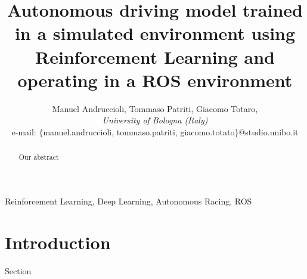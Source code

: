 \documentclass[conference]{IEEEtran}
\begin{document}
\title{
    Autonomous driving model trained in a simulated environment using Reinforcement Learning and operating in a ROS environment
}

\author{Manuel Andruccioli,
Tommaso Patriti,
Giacomo Totaro,\\ 
\textit{University of Bologna (Italy)} \\
e-mail: $\{$manuel.andruccioli, tommaso.patriti, giacomo.totato$\}$@studio.unibo.it }

\maketitle

\begin{abstract}
Our abstract
\end{abstract}

\begin{IEEEkeywords}
    Reinforcement Learning, Deep Learning, Autonomous Racing, ROS
\end{IEEEkeywords}

\section{Introduction}

Section \cite{test}



\end{document}
